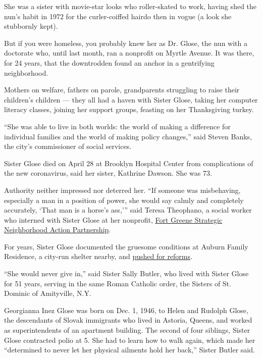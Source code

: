 She was a sister with movie-star looks who roller-skated to work, having
shed the nun's habit in 1972 for the curler-coiffed hairdo then in vogue
(a look she stubbornly kept).

But if you were homeless, you probably knew her as Dr. Glose, the nun
with a doctorate who, until last month, ran a nonprofit on Myrtle
Avenue. It was there, for 24 years, that the downtrodden found an anchor
in a gentrifying neighborhood.

Mothers on welfare, fathers on parole, grandparents struggling to raise
their children's children --- they all had a haven with Sister Glose,
taking her computer literacy classes, joining her support groups,
feasting on her Thanksgiving turkey.

``She was able to live in both worlds: the world of making a difference
for individual families and the world of making policy changes,'' said
Steven Banks, the city's commissioner of social services.

Sister Glose died on April 28 at Brooklyn Hospital Center from
complications of the new coronavirus, said her sister, Kathrine Dawson.
She was 73.

Authority neither impressed nor deterred her. ``If someone was
misbehaving, especially a man in a position of power, she would say
calmly and completely accurately, `That man is a horse's ass,''' said
Teresa Theophano, a social worker who interned with Sister Glose at her
nonprofit, \href{http://www.fortgreenesnap.org/}{Fort Greene Strategic
Neighborhood Action Partnership}.

For years, Sister Glose documented the gruesome conditions at Auburn
Family Residence, a city-run shelter nearby, and
\href{https://www.nytimes.com/2014/02/21/nyregion/new-york-is-removing-over-400-children-from-2-homeless-shelters.html}{pushed
for reforms}.

``She would never give in,'' said Sister Sally Butler, who lived with
Sister Glose for 51 years, serving in the same Roman Catholic order, the
Sisters of St. Dominic of Amityville, N.Y.

Georgianna Inez Glose was born on Dec. 1, 1946, to Helen and Rudolph
Glose, the descendants of Slovak immigrants who lived in Astoria,
Queens, and worked as superintendents of an apartment building. The
second of four siblings, Sister Glose contracted polio at 5. She had to
learn how to walk again, which made her ``determined to never let her
physical ailments hold her back,'' Sister Butler said.

